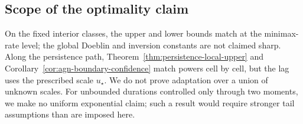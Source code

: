 \subsection{Scope of the optimality claim}
\label{subsec:optimality-scope}

On the fixed interior classes, the upper and lower bounds match at the
minimax-rate level; the global Doeblin and inversion constants are not claimed
sharp.  Along the persistence path,
Theorem~\ref{thm:persistence-local-upper} and
Corollary~\ref{cor:agn-boundary-confidence} match powers cell by cell, but the
lag uses the prescribed scale $u_\star$.  We do not prove adaptation over a
union of unknown scales.  For unbounded durations controlled only through two
moments, we make no uniform exponential claim; such a result would require
stronger tail assumptions than are imposed here.
